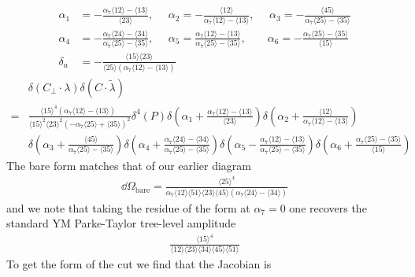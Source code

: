 \documentclass[letter,11pt]{article}
\newcommand{\ab}[1]{\langle #1 \rangle}
\begin{document}
\begin{equation}
	\begin{aligned}
		\alpha_1&=-\frac{
			\alpha_7\ab{12}-\ab{13}
		}{	\ab{23}},~~~~~~
		\alpha_2=-\frac{\ab{12}}{\alpha_7\ab{12}-\ab{13}},~~~~~~
		\alpha_3=-\frac{\ab{45}}{\alpha_7\ab{25}-\ab{35}}\\
		\alpha_4&=-\frac{\alpha_7\ab{24}-\ab{34}}{\alpha_7\ab{25}-\ab{35}}
		,~~~~~~
		\alpha_5=\frac{\alpha_7\ab{12}-\ab{13}}{\alpha_7\ab{25}-\ab{35}}
		,~~~~~~~~\,
		\alpha_6=-\frac{\alpha_7\ab{25}-\ab{35}}{\ab{15}}
		\\
		\delta_a&=-\frac{\ab{15}\ab{23}}{\ab{25}\left(\alpha_7\ab{12}-\ab{13}\right)}
	\end{aligned}
\end{equation}
\begin{equation}
	\begin{aligned}
		&\delta(C_\perp\cdot \lambda)\delta(C\cdot \tilde \lambda)\\
		=&
		\frac{\ab{15}^4\left(\alpha_7\ab{12}-\ab{13}\right)^{\phantom{2}}}{\ab{15}^2\ab{23}^2 \left(-\alpha_7\ab{25}+\ab{35}\right)^2}\delta^4( P)
		\delta\left(\alpha_1+\frac{
			\alpha_7\ab{12}-\ab{13}
		}{	\ab{23}}\right)
		\delta\left(\alpha_2+\frac{\ab{12}}{\alpha_7\ab{12}-\ab{13}}\right)\\&
		\delta\left(\alpha_3+\frac{\ab{45}}{\alpha_7\ab{25}-\ab{35}}\right)
		\delta\left(\alpha_4+\frac{\alpha_7\ab{24}-\ab{34}}{\alpha_7\ab{25}-\ab{35}}\right)
		\delta\left(\alpha_5-\frac{\alpha_7\ab{12}-\ab{13}}{\alpha_7\ab{25}-\ab{35}}\right)
		\delta\left(\alpha_6+\frac{\alpha_7\ab{25}-\ab{35}}{\ab{15}}\right)
	\end{aligned}
\end{equation}
The bare form matches that of our earlier diagram
\begin{equation}
	\begin{aligned}
		\dd \Omega_{\text{bare}}=	\frac{\ab{25}^4}{\alpha_7 \ab{12}\ab{51}\ab{23}\ab{45}\left(\alpha_7\ab{24}-\ab{34}\right)}
	\end{aligned}
\end{equation}
and we note that taking the residue of the form at $\alpha_7=0$ one recovers the standard YM Parke-Taylor tree-level amplitude
\begin{equation}
	\begin{aligned}
			\frac{\ab{15}^4}{ \ab{12}\ab{23}\ab{34}\ab{45}\ab{51}}
	\end{aligned}
\end{equation}
To get the form of the cut we find that the Jacobian is
\end{document}
